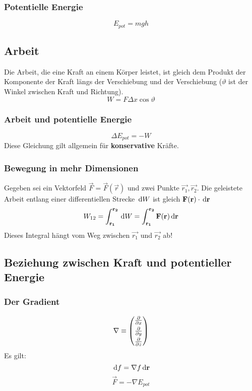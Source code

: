 \subsubsection{Potentielle Energie}
\begin{equation}
E_{pot} = m g h
\end{equation}
\subsection{Arbeit}
Die Arbeit, die eine Kraft an einem Körper leistet, ist gleich dem Produkt der Komponente der Kraft längs der Verschiebung und der Verschiebung ($\vartheta$ ist der Winkel zwischen Kraft und Richtung).
\begin{equation}
W = F \Delta x \cos \vartheta
\end{equation}
\subsubsection{Arbeit und potentielle Energie}
\begin{equation}
\Delta E_{pot} = -W
\end{equation}
Diese Gleichung gilt allgemein für \textbf{konservative} Kräfte.
\subsubsection{Bewegung in mehr Dimensionen}
Gegeben sei ein Vektorfeld $\vec{F} = \vec{F}(\vec{r})$ und zwei Punkte $\vec{r_1}, \vec{r_2}$. Die geleistete Arbeit entlang einer differentiellen Strecke $\,\mathrm{d} W$ ist gleich $ \mathbf{F}(\mathbf{r}) \cdot \,\mathrm{d} \mathbf{r}$
\begin{equation}
W_{12} = \int_{\mathbf{r_1}}^{\mathbf{r_2}} \,\mathrm{d} W = \int_{\mathbf{r_1}}^{\mathbf{r_2}} \mathbf{F}(\mathbf{r}) \,\mathrm{d} \mathbf{r}
\end{equation}
Dieses Integral hängt vom Weg zwischen $\vec{r_1}$ und $\vec{r_2}$ ab!
\subsection{Beziehung zwischen Kraft und potentieller Energie}
\subsubsection{Der Gradient}
\begin{equation}
\nabla \equiv 
\begin{pmatrix}
\frac{\partial }{\partial x} \\[0.3em]
\frac{\partial }{\partial y} \\[0.3em]
\frac{\partial }{\partial z}
\end{pmatrix}
\end{equation}
Es gilt:
\begin{equation}
\,\mathrm{d} f = \nabla f \,\mathrm{d} \mathbf{r}
\end{equation}
\begin{equation}
\vec{F} = -\nabla E_{pot}
\end{equation}

